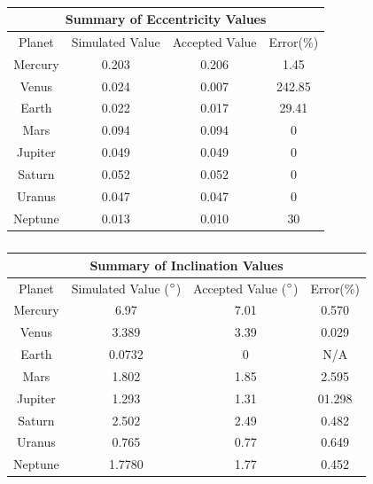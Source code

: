 \documentclass[a4paper,12pt]{article} %
\numberwithin{equation}{section} %
\numberwithin{figure}{section} %
\begin{document}
\begin{table}[h!]
\centering
\caption{}
\label{tab:table_3}
\begin{tabular}{|c|c|c|c|}
\hline
\multicolumn{4}{|c|}{Summary of Eccentricity Values}\\
\hline
Planet & Simulated Value & Accepted Value \cite{eccentricity_info} & Error(\%)\\
\hline
Mercury & 0.203 & 0.206 & 1.45\\
\hline
Venus & 0.024 & 0.007 & 242.85\\
\hline
Earth & 0.022 & 0.017 & 29.41\\
\hline
Mars & 0.094 & 0.094 & 0\\
\hline
Jupiter & 0.049 & 0.049 & 0\\
\hline
Saturn & 0.052 & 0.052 & 0\\
\hline
Uranus & 0.047 & 0.047 & 0\\
\hline
Neptune & 0.013 & 0.010 & 30\\
\hline
\end{tabular}
\end{table}


\begin{table}[h!]
\centering
\caption{}
\label{tab:table_4}
\begin{tabular}{|c|c|c|c|}
\hline
\multicolumn{4}{|c|}{Summary of Inclination Values}\\
\hline
Planet & Simulated Value ($\degree$) & Accepted Value ($\degree$) \cite{inclination_info} & Error(\%)\\
\hline
Mercury & 6.97 & 7.01 & 0.570\\
\hline
Venus & 3.389 & 3.39 & 0.029\\
\hline
Earth & 0.0732 & 0 & N/A\\
\hline
Mars & 1.802 & 1.85 & 2.595\\
\hline
Jupiter & 1.293 & 1.31 & 01.298\\
\hline
Saturn & 2.502 & 2.49 & 0.482\\
\hline
Uranus & 0.765 & 0.77 & 0.649\\
\hline
Neptune & 1.7780 & 1.77 & 0.452\\
\hline
\end{tabular}
\end{table}

\FloatBarrier
\end{document}
